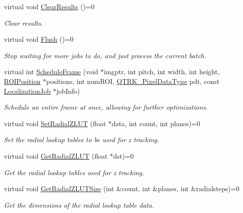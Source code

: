 \begin{DoxyCompactItemize}
virtual void \hyperlink{class_queued_tracker_a5e46c8ce4bd3b965bedd8aac095304c2}{Clear\+Results} ()=0
\begin{DoxyCompactList}\small\item\em Clear results. \end{DoxyCompactList}\item 
virtual void \hyperlink{class_queued_tracker_a97cf826c17ab9b3e55d8ecd513d58098}{Flush} ()=0
\begin{DoxyCompactList}\small\item\em Stop waiting for more jobs to do, and just process the current batch. \end{DoxyCompactList}\item 
virtual int \hyperlink{class_queued_tracker_ab80776ec6e8b2202d858f1c9cb989240}{Schedule\+Frame} (void $\ast$imgptr, int pitch, int width, int height, \hyperlink{struct_r_o_i_position}{R\+O\+I\+Position} $\ast$positions, int num\+R\+OI, \hyperlink{qtrk__c__api_8h_aad82367b3ea592a142bb50a2fb538b0b}{Q\+T\+R\+K\+\_\+\+Pixel\+Data\+Type} pdt, const \hyperlink{struct_localization_job}{Localization\+Job} $\ast$job\+Info)
\begin{DoxyCompactList}\small\item\em Schedule an entire frame at once, allowing for further optimizations. \end{DoxyCompactList}\item 
virtual void \hyperlink{class_queued_tracker_a77c3d8414993d2aa3ddfca4c8b40e71d}{Set\+Radial\+Z\+L\+UT} (float $\ast$data, int count, int planes)=0
\begin{DoxyCompactList}\small\item\em Set the radial lookup tables to be used for z tracking. \end{DoxyCompactList}\item 
virtual void \hyperlink{class_queued_tracker_a7e92adfa46401d802eaff7687e43dad7}{Get\+Radial\+Z\+L\+UT} (float $\ast$dst)=0
\begin{DoxyCompactList}\small\item\em Get the radial lookup tables used for z tracking. \end{DoxyCompactList}\item 
virtual void \hyperlink{class_queued_tracker_a95e19cdbbaa59eb676a24aaf95058b27}{Get\+Radial\+Z\+L\+U\+T\+Size} (int \&count, int \&planes, int \&radialsteps)=0
\begin{DoxyCompactList}\small\item\em Get the dimensions of the radial lookup table data. \end{DoxyCompactList}\item 

\end{DoxyCompactItemize}
